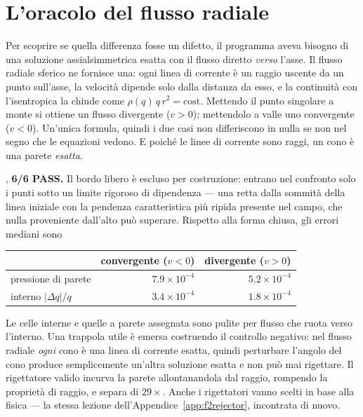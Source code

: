 \section{L'oracolo del flusso radiale}
\label{sec:radialoracle}

Per scoprire se quella differenza fosse un difetto, il programma
aveva bisogno di una soluzione assialsimmetrica esatta con il flusso
diretto \emph{verso} l'asse. Il flusso radiale sferico ne fornisce
una: ogni linea di corrente è un raggio uscente da un punto
sull'asse, la velocità dipende solo dalla distanza da esso, e la
continuità con l'isentropica la chiude come
$\rho(q)\,q\,r^2 = \mathrm{cost}$. Mettendo il punto singolare a
monte si ottiene un flusso divergente ($v>0$); mettendolo a valle uno
convergente ($v<0$). Un'unica formula, quindi i due casi non
differiscono in nulla se non nel segno che le equazioni vedono. E
poiché le linee di corrente sono raggi, un cono è una parete
\emph{esatta}.

, \textbf{6/6 PASS.}
Il bordo libero è escluso per costruzione: entrano nel confronto solo
i punti sotto un limite rigoroso di dipendenza --- una retta dalla
sommità della linea iniziale con la pendenza caratteristica più
ripida presente nel campo, che nulla proveniente dall'alto può
superare. Rispetto alla forma chiusa, gli errori mediani sono

\begin{center}
\small
\begin{tabular}{lrr}
\toprule
 & convergente ($v<0$) & divergente ($v>0$) \\
\midrule
pressione di parete & $7.9\times10^{-4}$ & $5.2\times10^{-4}$ \\
interno $|\Delta q|/q$ & $3.4\times10^{-4}$ & $1.8\times10^{-4}$ \\
\bottomrule
\end{tabular}
\end{center}

\noindent Le celle interne e quelle a parete assegnata sono pulite
per flusso che ruota verso l'interno. Una trappola utile è emersa
costruendo il controllo negativo: nel flusso radiale \emph{ogni} cono
è una linea di corrente esatta, quindi perturbare l'angolo del cono
produce semplicemente un'altra soluzione esatta e non può mai
rigettare. Il rigettatore valido incurva la parete allontanandola dal
raggio, rompendo la proprietà di raggio, e separa di $29\times$.
Anche i rigettatori vanno scelti in base alla fisica --- la stessa
lezione dell'Appendice~\ref{app:f2rejector}, incontrata di nuovo.

